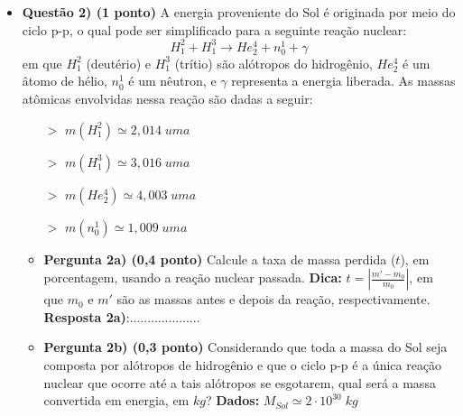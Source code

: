\documentclass[a4paper, 12pt]{article}
\begin{document}
\begin{flushleft}
\begin{itemize}
		\item \textbf{Questão 2) (1 ponto)} A energia proveniente do Sol é originada por meio do ciclo p-p, o qual pode ser simplificado para a seguinte reação nuclear:
			$$H_1^2 + H_1^3 \longrightarrow He_2^4 + n_0^1 + \gamma$$
			em que $H_1^2$ (deutério) e $H_1^3$ (trítio) são alótropos do hidrogênio, $He_2^4$ é um âtomo de hélio, $n_0^1$ é um nêutron, e $\gamma$ representa a energia liberada. \linebreak
			As massas atômicas envolvidas nessa reação são dadas a seguir:
				\begin{multicols}{2} \begin{itemize}
					\item[$>$] $m(H_1^2) \simeq 2,014 \; uma$
					\item[$>$] $m(H_1^3) \simeq 3,016 \; uma$
					\item[$>$] $m(He_2^4) \simeq 4,003 \; uma$
					\item[$>$] $m(n_0^1) \simeq 1,009 \; uma$
				\end{itemize} \end{multicols}
				\begin{itemize}
					\item \textbf{Pergunta 2a) (0,4 ponto)} Calcule a taxa de massa perdida ($t$), em porcentagem, usando a reação nuclear passada. \linebreak
						\textbf{Dica:} $t= \left| \frac{m'-m_0}{m_0} \right|$, em que $m_0$ e $m'$ são as massas antes e depois da reação, respectivamente.
						\linebreak \linebreak \linebreak \linebreak \linebreak \linebreak \linebreak \linebreak \linebreak
						\textbf{Resposta 2a)}:....................
					\item \textbf{Pergunta 2b) (0,3 ponto)} Considerando que toda a massa do Sol seja composta por alótropos de hidrogênio e que o ciclo p-p é a única reação nuclear que ocorre até a tais alótropos se esgotarem, qual será a massa convertida em energia, em $kg$? \linebreak
						\textbf{Dados:} $M_{Sol} \simeq 2 \cdot 10^{30} \; kg$
						\linebreak \linebreak \linebreak \linebreak \linebreak \linebreak \linebreak

\end{itemize}
\end{itemize}
\end{flushleft}
\end{document}
